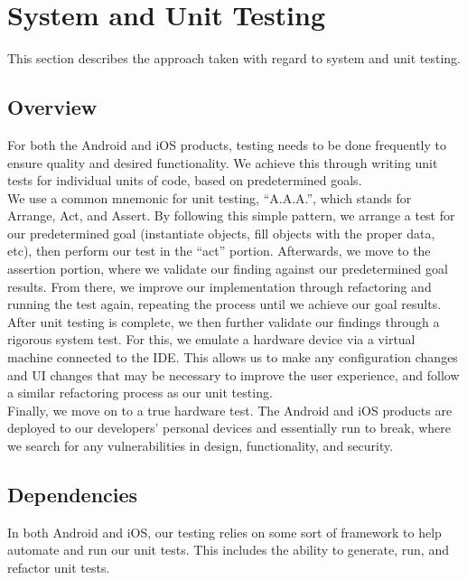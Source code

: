 
\chapter{System  and Unit Testing}

This section describes the approach taken with regard to system and unit testing. 

\section{Overview}
For both the Android and iOS products, testing needs to be done frequently to ensure quality and desired functionality. We achieve this through writing unit tests for individual units of code, based on predetermined goals.\\


We use a common mnemonic for unit testing, ``A.A.A.'', which stands for Arrange, Act, and Assert. By following this simple pattern, we arrange a test for our predetermined goal (instantiate objects, fill objects with the proper data, etc), then perform our test in the ``act'' portion. Afterwards, we move to the assertion portion, where we validate our finding against our predetermined goal results. From there, we improve our implementation through refactoring and running the test again, repeating the process until we achieve our goal results.\\

After unit testing is complete, we then further validate our findings through a rigorous system test. For this, we emulate a hardware device via a virtual machine connected to the IDE. This allows us to make any configuration changes and UI changes that may be necessary to improve the user experience, and follow a similar refactoring process as our unit testing.\\

Finally, we move on to a true hardware test. The Android and iOS products are deployed to our developers' personal devices and essentially run to break, where we search for any vulnerabilities in design, functionality, and security.

\section{Dependencies}
In both Android and iOS, our testing relies on some sort of framework to help automate and run our unit tests. This includes the ability to generate, run, and refactor unit tests. 

